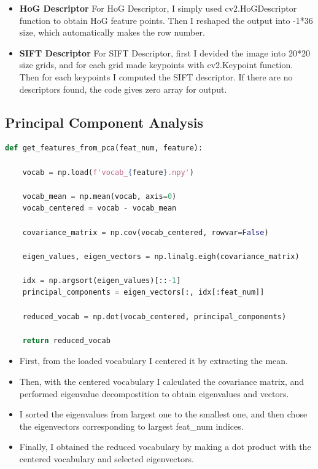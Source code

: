 \begin{itemize}
    \item \textbf{HoG Descriptor} For HoG Descriptor, I simply used cv2.HoGDescriptor function to obtain HoG feature points. Then I reshaped the output into -1*36 size, which automatically makes the row number.
    \item \textbf{SIFT Descriptor} For SIFT Descriptor, first I devided the image into 20*20 size grids, and for each grid made keypoints with cv2.Keypoint function. Then for each keypoints I computed the SIFT descriptor. If there are no descriptors found, the code gives zero array for output.
\end{itemize}
\subsection*{Principal Component Analysis}
\begin{lstlisting}[language=python]
def get_features_from_pca(feat_num, feature):

    vocab = np.load(f'vocab_{feature}.npy')
    
    vocab_mean = np.mean(vocab, axis=0)
    vocab_centered = vocab - vocab_mean

    covariance_matrix = np.cov(vocab_centered, rowvar=False)

    eigen_values, eigen_vectors = np.linalg.eigh(covariance_matrix)

    idx = np.argsort(eigen_values)[::-1]
    principal_components = eigen_vectors[:, idx[:feat_num]]

    reduced_vocab = np.dot(vocab_centered, principal_components)

    return reduced_vocab
\end{lstlisting}
\begin{itemize}
    \item First, from the loaded vocabulary I centered it by extracting the mean.
    \item Then, with the centered vocabulary I calculated the covariance matrix, and performed eigenvalue decompostition to obtain eigenvalues and vectors.
    \item I sorted the eigenvalues from largest one to the smallest one, and then chose the eigenvectors corresponding to largest feat\_num indices. 
    \item Finally, I obtained the reduced vocabulary by making a dot product with the centered vocabulary and selected eigenvectors.
\end{itemize}
